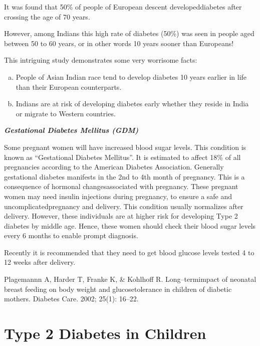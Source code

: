 It was found that 50\% of people of European descent developed\break diabetes after crossing the age of 70 years.

However, among Indians this high rate of diabetes (50\%) was seen in people aged between 50 to 60 years, or in other words 10 years sooner than Europeans!

This intriguing study demonstrates some very worrisome facts:

\begin{enumerate}[a)]
\itemsep=0pt
\item People of Asian Indian race tend to develop diabetes 10 years earlier in life than their European counterparts.
\item Indians are at risk of developing diabetes early whether they reside in India or migrate to Western countries.
\end{enumerate}

\setlength{\parskip}{.2em}
\noindent
\textbf{\textit{Gestational Diabetes Mellitus (GDM)}}

Some pregnant women will have increased blood sugar levels. This condition is known as “Gestational Diabetes Mellitus”. It is estimated to affect 18\% of all pregnancies according to the American Diabetes Association. Generally gestational diabetes manifests in the 2nd to 4th month of pregnancy. This is a consequence of hormonal changes\break associated with pregnancy. These pregnant women may need insulin injections during pregnancy, to ensure a safe and uncomplicated\break pregnancy and delivery. This condition usually normalizes after deli\-very. However, these individuals are at higher risk for developing Type 2 diabetes by middle age. Hence, these women should check their blood sugar levels every 6 months to enable prompt diagnosis.

Recently it is recommended that they need to get blood glucose levels tested 4 to 12 weeks after delivery.

\setlength{\parskip}{.2em}
\begin{thebibliography}{99}
 Plagemannn A, Harder T, Franke K, \& Kohlhoff R. Long–term\break impact of neonatal breast feeding on body weight and glucose\break tolerance in children of diabetic mothers. Diabetes Care. 2002; 25(1): 16–22.
\end{thebibliography}


\chapter{Type 2 Diabetes in Children}\label{chap7}

